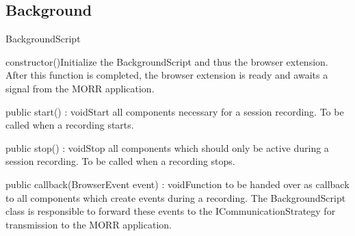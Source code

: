 \subsection{Background}
\begin{class}{BackgroundScript}




\begin{constructors}
\begin{constructor}{constructor()}{Initialize the BackgroundScript and thus the browser extension. After this function is completed, the browser extension is ready and awaits a signal from the MORR application.}
\end{constructor}
\end{constructors}
\begin{methods}
\begin{method}{public start() : void}{Start all components necessary for a session recording. To be called when a recording starts.}
\end{method}
\begin{method}{public stop() : void}{Stop all components which should only be active during a session recording. To be called when a recording stops.}
\end{method}
\begin{method}{public callback(BrowserEvent event) : void}{Function to be handed over as callback to all components which create events during a recording. The BackgroundScript class is responsible to forward these events to the ICommunicationStrategy for transmission to the MORR application.}
\begin{parameters}
\end{parameters}
\end{method}
\end{methods}
\end{class}

